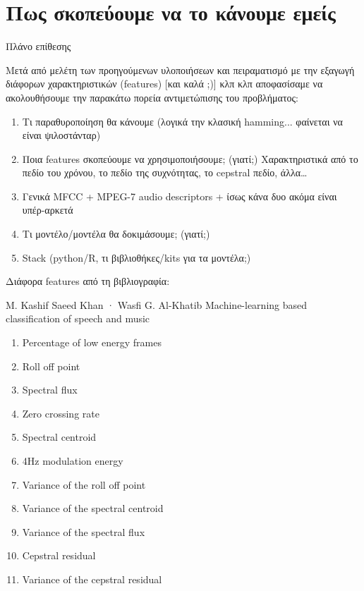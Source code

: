 \section{Πως σκοπεύουμε να το κάνουμε εμείς}

Πλάνο επίθεσης

Μετά από μελέτη των προηγούμενων υλοποιήσεων και πειραματισμό με την
εξαγωγή διάφορων χαρακτηριστικών (features) [και καλά ;)] κλπ κλπ
αποφασίσαμε να ακολουθήσουμε την παρακάτω πορεία αντιμετώπισης του
προβλήματος:

\begin{enumerate}[noitemsep]
\item Τι παραθυροποίηση θα κάνουμε (λογικά την κλασική
  hamming... φαίνεται να είναι ψιλοστάνταρ)
\item Ποια features σκοπεύουμε να χρησιμοποιήσουμε; (γιατί;)
  Χαρακτηριστικά από το πεδίο του χρόνου, το πεδίο της συχνότητας, το
  cepstral πεδίο, άλλα…
\item Γενικά MFCC + MPEG-7 audio descriptors + ίσως κάνα δυο ακόμα
  είναι υπέρ-αρκετά
\item Τι μοντέλο/μοντέλα θα δοκιμάσουμε; (γιατί;)
\item Stack (python/R, τι βιβλιοθήκες/kits για τα μοντέλα;)
\end{enumerate}


Διάφορα features από τη βιβλιογραφία:

M. Kashif Saeed Khan · Wasfi G. Al-Khatib
Machine-learning based classification of speech and music

\begin{enumerate}[noitemsep]
\item Percentage of low energy frames
\item Roll off point
\item Spectral
  flux
\item Zero crossing rate
\item Spectral centroid
\item 4Hz modulation
  energy
\item Variance of the roll off point
\item Variance of the spectral
  centroid
\item Variance of the spectral flux
\item Cepstral residual
\item Variance of the cepstral residual
\end{enumerate}

